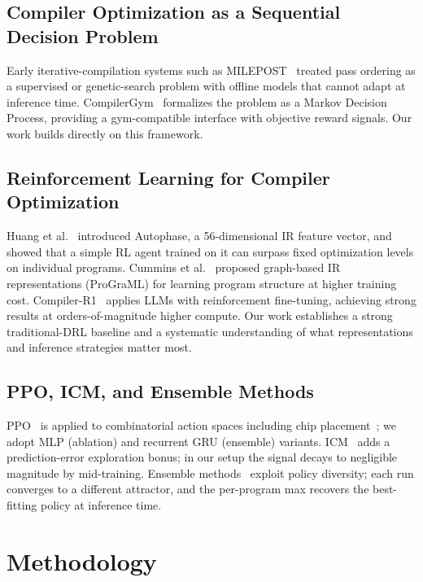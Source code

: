 \documentclass{article}
\begin{document}
\subsection{Compiler Optimization as a Sequential Decision Problem}

Early iterative-compilation systems such as MILEPOST~\cite{fursin2011milepost}
treated pass ordering as a supervised or genetic-search problem with offline
models that cannot adapt at inference time.
CompilerGym~\cite{CompilerGym} formalizes the problem as a Markov Decision
Process, providing a gym-compatible interface with objective reward signals.
Our work builds directly on this framework.

\subsection{Reinforcement Learning for Compiler Optimization}

Huang et al.~\cite{8735549} introduced Autophase, a 56-dimensional IR feature
vector, and showed that a simple RL agent trained on it can surpass fixed
optimization levels on individual programs.
Cummins et al.~\cite{cummins2021programl} proposed graph-based IR
representations (ProGraML) for learning program structure at higher training
cost.
Compiler-R1~\cite{pan2026compiler} applies LLMs with reinforcement fine-tuning,
achieving strong results at orders-of-magnitude higher compute.
Our work establishes a strong traditional-DRL baseline and a systematic
understanding of what representations and inference strategies matter most.

\subsection{PPO, ICM, and Ensemble Methods}
PPO~\cite{schulman2017proximal} is applied to combinatorial action spaces
including chip placement~\cite{mirhoseini2021graph}; we adopt MLP (ablation)
and recurrent GRU (ensemble) variants.
ICM~\cite{pathak2017curiosity} adds a prediction-error exploration bonus;
in our setup the signal decays to negligible magnitude by mid-training.
Ensemble methods~\cite{lakshminarayanan2017simple, osband2016deep} exploit
policy diversity; each run converges to a different attractor, and the
per-program max recovers the best-fitting policy at inference time.


\section{Methodology}
\end{document}

